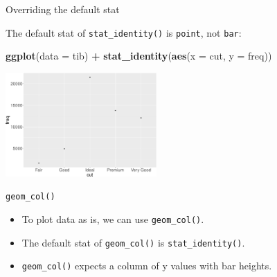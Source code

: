 \documentclass[ignorenonframetext,]{beamer}
\newenvironment{Shaded}{\begin{snugshade}}{\end{snugshade}}
\newcommand{\DataTypeTok}[1]{\textcolor[rgb]{0.13,0.29,0.53}{#1}}
\newcommand{\KeywordTok}[1]{\textcolor[rgb]{0.13,0.29,0.53}{\textbf{#1}}}
\newcommand{\NormalTok}[1]{#1}
\newcommand{\OperatorTok}[1]{\textcolor[rgb]{0.81,0.36,0.00}{\textbf{#1}}}
\newcommand{\StringTok}[1]{\textcolor[rgb]{0.31,0.60,0.02}{#1}}
\begin{document}
\begin{frame}[fragile]{Overriding the default stat}
\protect\hypertarget{overriding-the-default-stat-1}{}

The default stat of \texttt{stat\_identity()} is \texttt{point}, not
\texttt{bar}:

\begin{Shaded}
\begin{Highlighting}[]
\KeywordTok{ggplot}\NormalTok{(}\DataTypeTok{data =}\NormalTok{ tib) }\OperatorTok{+}
\StringTok{  }\KeywordTok{stat_identity}\NormalTok{(}\KeywordTok{aes}\NormalTok{(}\DataTypeTok{x =}\NormalTok{ cut, }\DataTypeTok{y =}\NormalTok{ freq))}
\end{Highlighting}
\end{Shaded}

\begin{center}\includegraphics[height=150px]{data-visualization_files/figure-beamer/unnamed-chunk-116-1} \end{center}

\end{frame}

\begin{frame}[fragile]{\texttt{geom\_col()}}
\protect\hypertarget{geom_col}{}

\begin{itemize}
\item
  To plot data as is, we can use \texttt{geom\_col()}.
\item
  The default stat of \texttt{geom\_col()} is \texttt{stat\_identity()}.
\item
  \texttt{geom\_col()} expects a column of y values with bar heights.
\end{itemize}

\end{frame}
\end{document}
